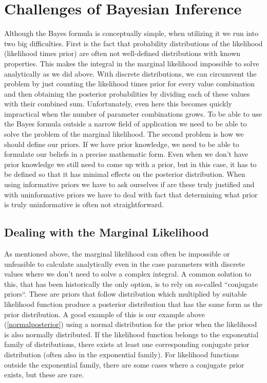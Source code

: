 \documentclass[12pt,a4paper,leqno]{report}
\theoremstyle{plain}
\theoremstyle{definition}
\theoremstyle{remark}
\begin{document}
\section{Challenges of Bayesian Inference}\label{bayesinferencechallenges}

Although the Bayes formula is conceptually simple, when utilizing
it we run into two big difficulties. First is the fact that
probability distributions of the likelihood (likelihood times prior) are often not
well-defined distributions with known properties. This makes the
integral in the marginal likelihood impossible to solve analytically as we did
above. With discrete distributions, we can circumvent the problem by just counting the
likelihood times prior for every value combination and then obtaining the posterior
probabilities by dividing each of these values with their combined sum. Unfortunately,
even here this becomes quickly impractical when the number of parameter combinations grows.
To be able to use the Bayes formula outside a narrow field of application we need to be able to solve the
problem of the marginal likelihood. The second problem is how we should define our priors.
If we have prior knowledge, we need to be able to
formulate our beliefs in a precise mathematic form. Even when we don't have prior knowledge we still
need to come up with a prior, but in this case, it has to be defined so that it has
minimal effects on the posterior distribution. When using informative priors we have to
ask ourselves if are these truly justified and with uninformative priors we have to deal
with fact that determining what prior is truly uninformative is often not straightforward.

\subsection{Dealing with the Marginal Likelihood}\label{marginallikehoodproblems}

As mentioned above, the marginal likelihood can often be impossible or
unfeasible to calculate analytically even in the case parameters with discrete
values where we don't need to solve a complex integral. A common solution to this,
that has been historically the only option, is to rely on so-called ``conjugate
priors``. These are priors that follow distribution which multiplied by
suitable likelihood function produce a posterior distribution that has the same
form as the prior distribution. A good example of this is our example above (\ref{normalposterior}) using a normal
distribution for the prior when the likelihood is also normally distributed. If
the likelihood function belongs to the exponential family of distributions, there
exists at least one corresponding conjugate prior distribution (often also in
the exponential family). For likelihood functions outside the exponential family,
there are some cases where a conjugate prior exists, but these are rare.
\end{document}
